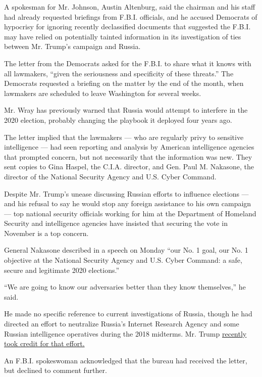A spokesman for Mr. Johnson, Austin Altenburg, said the chairman and his
staff had already requested briefings from F.B.I. officials, and he
accused Democrats of hypocrisy for ignoring recently declassified
documents that suggested the F.B.I. may have relied on potentially
tainted information in its investigation of ties between Mr. Trump's
campaign and Russia.

The letter from the Democrats asked for the F.B.I. to share what it
knows with all lawmakers, ``given the seriousness and specificity of
these threats.'' The Democrats requested a briefing on the matter by the
end of the month, when lawmakers are scheduled to leave Washington for
several weeks.

Mr. Wray has previously warned that Russia would attempt to interfere in
the 2020 election, probably changing the playbook it deployed four years
ago.

The letter implied that the lawmakers --- who are regularly privy to
sensitive intelligence --- had seen reporting and analysis by American
intelligence agencies that prompted concern, but not necessarily that
the information was new. They sent copies to Gina Haspel, the C.I.A.
director, and Gen. Paul M. Nakasone, the director of the National
Security Agency and U.S. Cyber Command.

Despite Mr. Trump's unease discussing Russian efforts to influence
elections --- and his refusal to say he would stop any foreign
assistance to his own campaign --- top national security officials
working for him at the Department of Homeland Security and intelligence
agencies have insisted that securing the vote in November is a top
concern.

General Nakasone described in a speech on Monday ``our No. 1 goal, our
No. 1 objective at the National Security Agency and U.S. Cyber Command:
a safe, secure and legitimate 2020 elections.''

``We are going to know our adversaries better than they know
themselves,'' he said.

He made no specific reference to current investigations of Russia,
though he had directed an effort to neutralize Russia's Internet
Research Agency and some Russian intelligence operatives during the 2018
midterms. Mr. Trump
\href{https://www.nytimes.com/2020/07/11/us/politics/trump-russia-cyber-attack.html}{recently
took credit for that effort.}

An F.B.I. spokeswoman acknowledged that the bureau had received the
letter, but declined to comment further.

